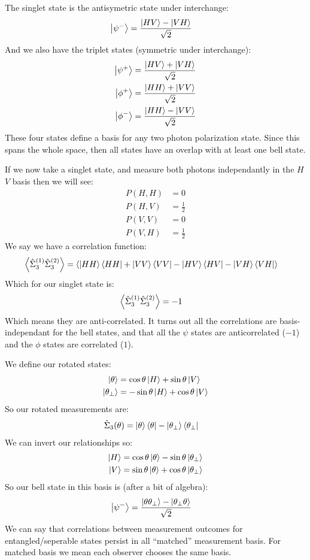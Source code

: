 The singlet state is the antisymetric state under interchange:
\begin{align*}
	\ket{\psi^-} &= \frac{\ket{HV} - \ket{VH}}{\sqrt{2}}
\end{align*}
And we also have the triplet states (symmetric under interchange):
\begin{align*}
	\ket{\psi^+} &= \frac{\ket{HV} + \ket{VH}}{\sqrt{2}} \\
	\ket{\phi^+} &= \frac{\ket{HH} + \ket{VV}}{\sqrt{2}} \\
	\ket{\phi^-} &= \frac{\ket{HH} - \ket{VV}}{\sqrt{2}}
\end{align*}
These four states define a basis for any two photon polarization state.
Since this spans the whole space, then all states have an overlap with at least one bell state.

If we now take a singlet state, and measure both photons independantly in the $H$ $V$ basis then we will see:
\begin{align*}
	P(H,H) &= 0 \\
	P(H,V) &= \frac{1}{2} \\
	P(V,V) &= 0 \\
	P(V,H) &= \frac{1}{2}
\end{align*}
We say we have a correlation function:
\begin{align*}
	\expval{\hat{\Sigma}_3^{(1)} \hat{\Sigma}_3^{(2)}} &= \expval{\ket{HH}\bra{HH} + \ket{VV}\bra{VV} - \ket{HV}\bra{HV} - \ket{VH}\bra{VH}}
\end{align*}
Which for our singlet state is:
\begin{align*}
	\expval{\hat{\Sigma}_3^{(1)} \hat{\Sigma}_3^{(2)}} &= -1
\end{align*}
Which means they are anti-correlated. 
It turns out all the correlations are basis-independant for the bell states, and that all the $\psi$ states are anticorrelated ($-1$) and the $\phi$ states are correlated ($1$).

We define our rotated states:
\begin{align*}
	\ket{\theta} &= \cos\theta \ket{H} + \sin\theta \ket{V} \\
	\ket{\theta_\perp} &= -\sin\theta\ket{H} + \cos\theta\ket{V}
\end{align*}
So our rotated measurements are:
\begin{align*}
	\hat{\Sigma}_3(\theta) &= \ket{\theta}\bra{\theta} - \ket{\theta_\perp}\bra{\theta_\perp}
\end{align*}
We can invert our relationships so:
\begin{align*}
	\ket{H} &= \cos\theta\ket{\theta} - \sin\theta\ket{\theta_\perp} \\
	\ket{V} &= \sin\theta\ket{\theta} + \cos\theta\ket{\theta_\perp}
\end{align*}
So our bell state in this basis is (after a bit of algebra):
\begin{align*}
	\ket{\psi^-} &= \frac{\ket{\theta\theta_\perp} - \ket{\theta_\perp\theta}}{\sqrt{2}}
\end{align*}
We can say that correlations between measurement outcomes for entangled/seperable states persist in all ``matched'' measurement basis. For matched basis we mean each observer chooses the same basis.

